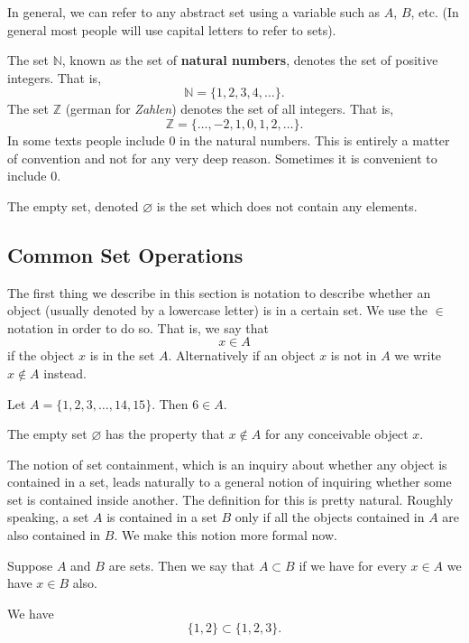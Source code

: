 In general, we can refer to any abstract set using a variable such as $A$, $B$, etc. (In general most people will use capital letters to refer to sets). 

\begin{example}
The set $\mathbb{N}$, known as the set of \textbf{natural numbers}, denotes the set of positive integers. That is,
\[\mathbb{N} = \{1, 2, 3, 4, \dots\}.\]
The set $\mathbb{Z}$ (german for \textit{Zahlen}) denotes the set of all integers. That is,
\[\mathbb{Z} = \{\dots, -2, 1, 0, 1, 2, \dots\}.\]
In some texts people include $0$ in the natural numbers. This is entirely a matter of convention and not for any very deep reason. Sometimes it is convenient to include $0$. 

The empty set, denoted $\varnothing$ is the set which does not contain any elements.
\end{example}

\subsection{Common Set Operations}

The first thing we describe in this section is notation to describe whether an object (usually denoted by a lowercase letter) is in a certain set. We use the $\in$ notation in order to do so. That is, we say that 
\[x \in A\]
if the object $x$ is in the set $A$. Alternatively if an object $x$ is not in $A$ we write $x \not\in A$ instead.

\begin{example}
Let $A = \{1, 2, 3, \dots, 14, 15\}$. Then $6 \in A$. 

The empty set $\varnothing$ has the property that $x \not\in A$ for any conceivable object $x$.
\end{example}

The notion of set containment, which is an inquiry about whether any object is contained in a set, leads naturally to a general notion of inquiring whether some set is contained inside another. The definition for this is pretty natural. Roughly speaking, a set $A$ is contained in a set $B$ only if all the objects contained in $A$ are also contained in $B$. We make this notion more formal now.

\begin{definition}
Suppose $A$ and $B$ are sets. Then we say that $A \subset B$ if we have for every $x \in A$ we have $x \in B$ also.
\end{definition}

\begin{example}
We have 
\[\{1, 2\} \subset \{1, 2, 3\}.\]
\end{example}